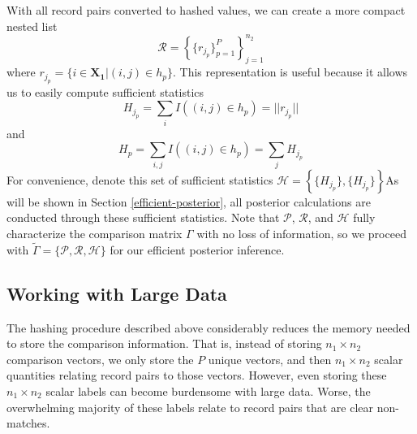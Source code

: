 \documentclass[12pt,letterpaper]{article}
\newcommand{\1}[1]{\mathbb{I}\!\left[#1\right]} %
\begin{document}
With all record pairs converted to hashed values, we can create a more compact nested list 
$$\mathcal{R} = \left\{\{r_{j_p} \}_{p=1}^{P} \right\}_{j = 1}^{n_2}$$
where $r_{j_p} = \{i \in \bm{X_1} | (i, j) \in h_p\}$. This representation is useful because it allows us to easily compute sufficient statistics
$$H_{j_p} = \sum_{i} I((i, j) \in h_p) = ||r_{j_p}||$$
and
$$H_p =  \sum_{i, j} I((i, j) \in h_p) = \sum_{j} H_{j_p}$$
For convenience, denote this set of sufficient statistics $\mathcal{H} = \left\{\{H_{j_p}\}, \{H_{j_p}\}\right\}$As will be shown in Section \ref{efficient-posterior}, all posterior calculations are conducted through these sufficient statistics. Note that $\mathcal{P}$, $\mathcal{R}$, and $\mathcal{H}$  fully characterize the comparison matrix $\Gamma$ with no loss of information, so we proceed with $\tilde{\Gamma} = \{\mathcal{P}, \mathcal{R}, \mathcal{H}\}$ for our efficient posterior inference. 

\hypertarget{large-data}{%
	\subsection{Working with Large Data}\label{large-data}}

The hashing procedure described above considerably reduces the memory
needed to store the comparison information. That is, instead of storing
\(n_1 \times n_2\) comparison vectors, we only store the
\(P\) unique vectors, and then \(n_1 \times n_2\) scalar quantities
relating record pairs to those vectors. However, even storing these
\(n_1 \times n_2\) scalar labels can become burdensome with large data.
Worse, the overwhelming majority of these labels relate to record pairs
that are clear non-matches.

\end{document}
